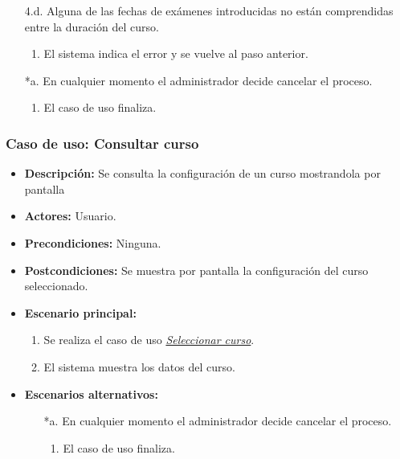 \documentclass{book}
\begin{document}
\begin{itemize}
\begin{itemize}
  \item[4.d.] Alguna de las fechas de exámenes introducidas no están comprendidas entre la duración del curso.
    \begin{enumerate}
    \item El sistema indica el error y se vuelve al paso anterior.
    \end{enumerate}
  \item[*a.] En cualquier momento el administrador decide cancelar el proceso.
    \begin{enumerate}
    \item El caso de uso finaliza.
    \end{enumerate}
  \end{itemize}
\end{itemize}



\subsubsection*{Caso de uso: Consultar curso}
\begin{itemize}
\item{\bf Descripción:} Se consulta la configuración de un curso mostrandola por pantalla
\item{\bf Actores:} Usuario.
\item{\bf Precondiciones:} Ninguna.
\item{\bf Postcondiciones:} Se muestra por pantalla la configuración del curso seleccionado.
\item{\bf Escenario principal:}
  \begin{enumerate}
  \item Se realiza el caso de uso {\em \hyperref[select_curso]{Seleccionar curso}}.
  \item El sistema muestra los datos del curso.
  \end{enumerate}
\item{\bf Escenarios alternativos:}
  \begin{itemize}
  \item[*a.] En cualquier momento el administrador decide cancelar el proceso.
    \begin{enumerate}
    \item El caso de uso finaliza.
    \end{enumerate}
  \end{itemize}
\end{itemize}
\end{document}

